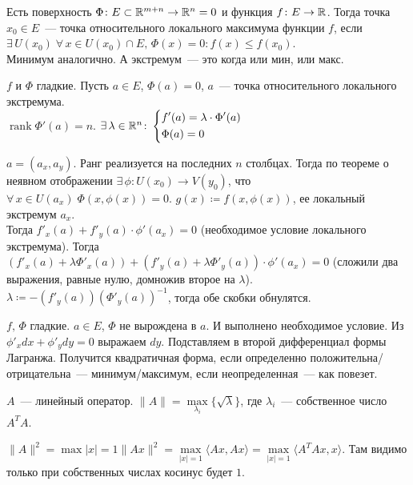 
\begin{defin*}
	Есть поверхность $\Phi\colon E\subset\rmy[m+n]\to\rmy[n] = 0$ и функция $f\colon E\to\rmy[]$. Тогда точка $x_0\in E$~--- точка относительного локального максимума функции $f$, если $\exists\,U(x_0)\;\forall\,x\in U(x_0)\cap E,\,\Phi(x)=0\colon f(x)\leqslant f(x_0)$.\\
	Минимум аналогично. А экстремум~--- это когда или мин, или макс.
\end{defin*}

\begin{Theorem*}
	$f$ и $\Phi$ гладкие. Пусть $a\in E$, $\Phi(a)=0$, $a$~--- точка относительного локального экстремума.\\
	$\operatorname{rank} \Phi'(a)=n$. \THEN $\exists\,\lambda\in\rmy[n]\colon\left\{\begin{aligned}
		&f'(a)=\lambda\cdot\Phi'(a)\\
		&\Phi(a)=0
	\end{aligned}\right.$
\end{Theorem*}

\begin{Proof}
	$a=(a_x,a_y)$. Ранг реализуется на последних $n$ столбцах. Тогда по теореме о неявном отображении $\exists\,\phi\colon U(x_0)\to V(y_0)$, что $\forall\,x\in U(a_x)\;\Phi(x,\phi(x))=0$. $g(x)\coloneqq f(x,\phi(x))$, ее локальный экстремум $a_x$.\\
	Тогда $f'_x(a)+f'_y(a)\cdot\phi'(a_x)=0$ (необходимое условие локального экстремума). Тогда $(f'_x(a)+\lambda\Phi'_x(a))+(f'_y(a)+\lambda\Phi'_y(a))\cdot\phi'(a_x)=0$ (сложили два выражения, равные нулю, домножив второе на $\lambda$). $\lambda\coloneqq-(f'_y(a))(\Phi'_y(a))^{-1}$, тогда обе скобки обнулятся.
\end{Proof}

\begin{Theorem*}
	$f,\,\Phi$ гладкие. $a\in E$, $\Phi$ не вырождена в $a$. И выполнено необходимое условие. Из $\phi'_x dx+\phi'_y dy=0$ выражаем $dy$. Подставляем в второй дифференциал формы Лагранжа. Получится квадратичная форма, если определенно положительна/отрицательна~--- минимум/максимум, если неопределенная~--- как повезет.
\end{Theorem*}

\begin{Theorem*}
	$A$~--- линейный оператор. \THEN $\|A\|=\max\limits_{\lambda_i}\{\sqrt{\lambda}\}$, где $\lambda_i$~--- собственное число $A^T A$.
\end{Theorem*}

\begin{Proof}
	$\|A\|^2=\max\limits{|x|=1} \|Ax\|^2=\max\limits_{|x|=1}\langle Ax,Ax\rangle=\max\limits_{|x|=1}\langle A^T Ax, x\rangle$. Там видимо только при собственных числах косинус будет $1$.
\end{Proof}

\newpage